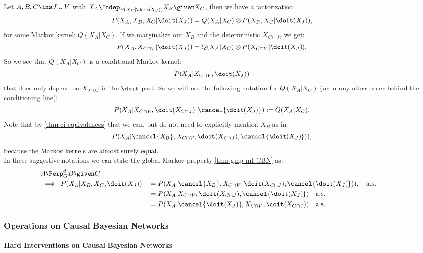 \begin{Not}
    Let $A,B,C \ins J \cup V$ with $X_A \Indep_{P(X_V|\doit(X_J))} X_B \given X_C$, then we have a factorization:
    \[ P(X_A,X_B,X_C|\doit(X_J)) = Q(X_A|X_C) \otimes P(X_B,X_C|\doit(X_J)),\]
    for some Markov kernel: $Q(X_A|X_C)$. If we marginalize out $X_B$ and the deterministic $X_{C \cap J}$,
    we get:
    \[ P(X_A,X_{C\cap V}|\doit(X_J)) = Q(X_A|X_C) \otimes P(X_{C\cap V}|\doit(X_J)).\]
    So we see that $Q(X_A|X_C)$ is a conditional Markov kernel:
    \[P(X_A|X_{C\cap V},\doit(X_J)) \]
    that does only depend on $X_{J \cap C}$ in the $\doit$-part.
    So we will use the following notation for $Q(X_A|X_C)$ (or in any other order behind the conditioning line):
    \[ P(X_A|X_{C \cap V},\doit(X_{C \cap J}),\cancel{\doit(X_J)}) := Q(X_A|X_C).  \]
    Note that by \ref{thm-ci-equivalences} that we can, but do not need to explicitly mention $X_B$ as in:
    \[ P(X_A|\cancel{X_B},X_{C \cap V},\doit(X_{C \cap J}),\cancel{\doit(X_J)})),  \]
    because the Markov kernels are almost surely equal.\\
    In these suggestive notations we can state the global Markov property \ref{thm-gmp-mI-CBN} as:
    \begin{align*} 
    &A \Perp^d_G B \given C \\
    &\implies \; P(X_A|X_B,X_C,\doit(X_J)) &&= P(X_A|\cancel{X_B},X_{C \cap V},\doit(X_{C \cap J}),\cancel{\doit(X_J)})),\quad \text{a.s.} \\
    & &&= P(X_A|X_{C \cap V},\doit(X_{C \cap J}),\cancel{\doit(X_J)}) \quad \text{a.s.}\\ 
    & &&= P(X_A|\cancel{\doit(X_J)},X_{C \cap V},\doit(X_{C \cap J})) \quad \text{a.s.}
    \end{align*}

\end{Not}




\subsubsection{Operations on Causal Bayesian Networks}
\paragraph{Hard Interventions on Causal Bayesian Networks}

